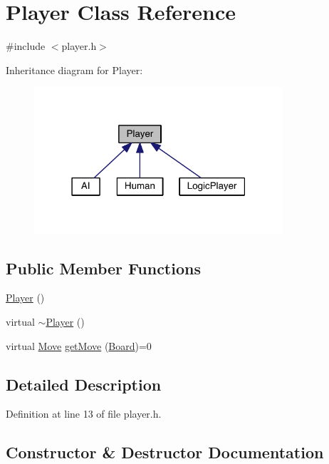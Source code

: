\hypertarget{class_player}{}\section{Player Class Reference}
\label{class_player}


{\ttfamily \#include $<$player.\+h$>$}



Inheritance diagram for Player\+:\nopagebreak
\begin{figure}[H]
\begin{center}
\leavevmode
\includegraphics[width=262pt]{class_player__inherit__graph}
\end{center}
\end{figure}
\subsection*{Public Member Functions}
\begin{DoxyCompactItemize}
\item 
\hyperlink{class_player_affe0cc3cb714f6deb4e62f0c0d3f1fd8}{Player} ()
\item 
virtual \hyperlink{class_player_a749d2c00e1fe0f5c2746f7505a58c062}{$\sim$\+Player} ()
\item 
virtual \hyperlink{struct_move}{Move} \hyperlink{class_player_a97a516ce71ccef14123884b562c90e4c}{get\+Move} (\hyperlink{constants_8h_af901d0acc1572fb0c779f84ddd2c6ce8}{Board})=0
\end{DoxyCompactItemize}


\subsection{Detailed Description}


Definition at line 13 of file player.\+h.



\subsection{Constructor \& Destructor Documentation}
\mbox{\label{class_player_affe0cc3cb714f6deb4e62f0c0d3f1fd8}} 
